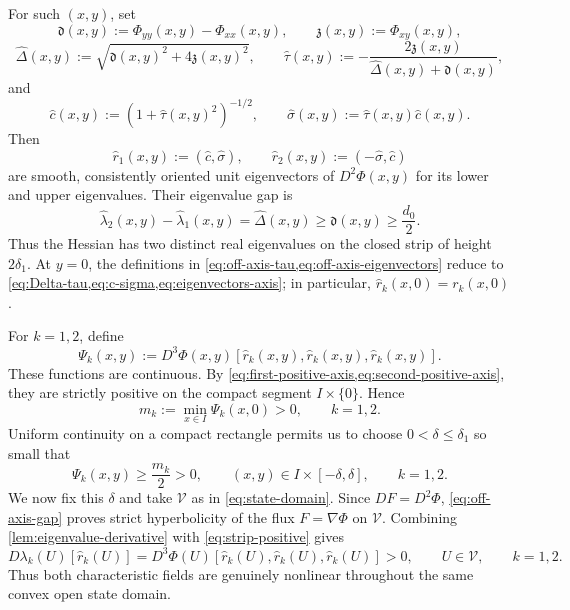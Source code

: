 \documentclass[11pt,reqno]{amsart}
\theoremstyle{definition}
\newcommand{\V}{\mathcal{V}}
\begin{document}
For such $(x,y)$, set
\begin{equation}
  \mathfrak d(x,y):=\Phi_{yy}(x,y)-\Phi_{xx}(x,y),
  \qquad
  \mathfrak z(x,y):=\Phi_{xy}(x,y),
\end{equation}
\begin{equation}
  \widehat\Delta(x,y)
  :=\sqrt{\mathfrak d(x,y)^2+4\mathfrak z(x,y)^2},
  \qquad
  \widehat\tau(x,y)
  :=-\frac{2\mathfrak z(x,y)}{
  \widehat\Delta(x,y)+\mathfrak d(x,y)},
  \label{eq:off-axis-tau}
\end{equation}
and
\begin{equation}
  \widehat c(x,y):=(1+\widehat\tau(x,y)^2)^{-1/2},
  \qquad
  \widehat\sigma(x,y):=\widehat\tau(x,y)\widehat c(x,y).
\end{equation}
Then
\begin{equation}
  \widehat r_1(x,y):=(\widehat c,\widehat\sigma),
  \qquad
  \widehat r_2(x,y):=(-\widehat\sigma,\widehat c)
  \label{eq:off-axis-eigenvectors}
\end{equation}
are smooth, consistently oriented unit eigenvectors of $D^2\Phi(x,y)$ for its
lower and upper eigenvalues.  Their eigenvalue gap is
\begin{equation}
  \widehat\lambda_2(x,y)-\widehat\lambda_1(x,y)
  =\widehat\Delta(x,y)
  \ge\mathfrak d(x,y)
  \ge\frac{d_0}{2}.
  \label{eq:off-axis-gap}
\end{equation}
Thus the Hessian has two distinct real eigenvalues on the closed strip of
height $2\delta_1$.  At $y=0$, the definitions in
\cref{eq:off-axis-tau,eq:off-axis-eigenvectors} reduce to
\cref{eq:Delta-tau,eq:c-sigma,eq:eigenvectors-axis}; in particular,
$\widehat r_k(x,0)=r_k(x,0)$.

For $k=1,2$, define
\begin{equation}
  \Psi_k(x,y)
  :=D^3\Phi(x,y)
  [\widehat r_k(x,y),\widehat r_k(x,y),\widehat r_k(x,y)].
  \label{eq:Psi-k}
\end{equation}
These functions are continuous.  By
\cref{eq:first-positive-axis,eq:second-positive-axis}, they are strictly
positive on the compact segment $I\times\{0\}$.  Hence
\begin{equation}
  m_k:=\min_{x\in I}\Psi_k(x,0)>0,
  \qquad k=1,2.
\end{equation}
Uniform continuity on a compact rectangle permits us to choose
$0<\delta\le\delta_1$ so small that
\begin{equation}
  \Psi_k(x,y)\ge\frac{m_k}{2}>0,
  \qquad
  (x,y)\in I\times[-\delta,\delta],
  \qquad k=1,2.
  \label{eq:strip-positive}
\end{equation}
We now fix this $\delta$ and take $\V$ as in \cref{eq:state-domain}.  Since
$DF=D^2\Phi$, \cref{eq:off-axis-gap} proves strict hyperbolicity of the flux
$F=\nabla\Phi$ on $\V$.  Combining \cref{lem:eigenvalue-derivative} with
\cref{eq:strip-positive} gives
\begin{equation}
  D\lambda_k(U)[\widehat r_k(U)]
  =D^3\Phi(U)[\widehat r_k(U),\widehat r_k(U),\widehat r_k(U)]
  >0,
  \qquad U\in\V,\qquad k=1,2.
  \label{eq:genuine-nonlinearity-final}
\end{equation}
Thus both characteristic fields are genuinely nonlinear throughout the same
convex open state domain.
\end{document}
